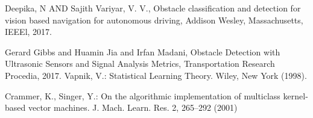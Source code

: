 \documentclass[a4paper]{report}
\begin{document}
\begin{thebibliography}{9}
          Deepika, N AND Sajith Variyar, V. V.,
          Obstacle classification and detection for vision based navigation for autonomous driving,
          Addison Wesley, Massachusetts,
          IEEEl,
          2017.
     
         
          Gerard Gibbs and Huamin Jia and Irfan Madani,
          Obstacle Detection with Ultrasonic Sensors and Signal Analysis Metrics,
          Transportation Research Procedia,
          2017.
		Vapnik, V.: Statistical Learning Theory. Wiley, New York (1998).

Crammer, K., Singer, Y.: On the algorithmic implementation of multiclass kernel-based vector machines. J. Mach. Learn. Res. 2, 265–292 (2001)
\end{thebibliography}

\listoffigures
\begingroup
\let\clearpage\relax
\listoftables
\endgroup
\end{document}
